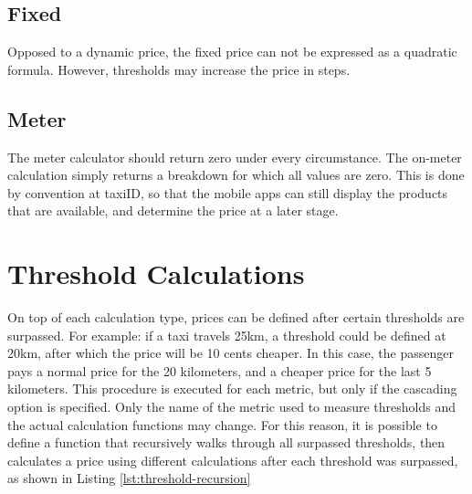 \subsection{Fixed}
Opposed to a dynamic price, the fixed price can not be expressed as a quadratic formula. However, thresholds may increase the price in steps.

\subsection{Meter}
The meter calculator should return zero under every circumstance. The on-meter calculation simply returns a breakdown for which all values are zero. This is done by convention at taxiID, so that the mobile apps can still display the products that are available, and determine the price at a later stage.

\section{Threshold Calculations}
On top of each calculation type, prices can be defined after certain thresholds are surpassed. For example: if a taxi travels 25km, a threshold could be defined at 20km, after which the price will be 10 cents cheaper. In this case, the passenger pays a normal price for the 20 kilometers, and a cheaper price for the last 5 kilometers. This procedure is executed for each metric, but only if the cascading option is specified.  Only the name of the metric used to measure thresholds and the actual calculation functions may change. For this reason, it is possible to define a function that recursively walks through all surpassed thresholds, then calculates a price using different calculations after each threshold was surpassed, as shown in Listing \ref{lst:threshold-recursion}

